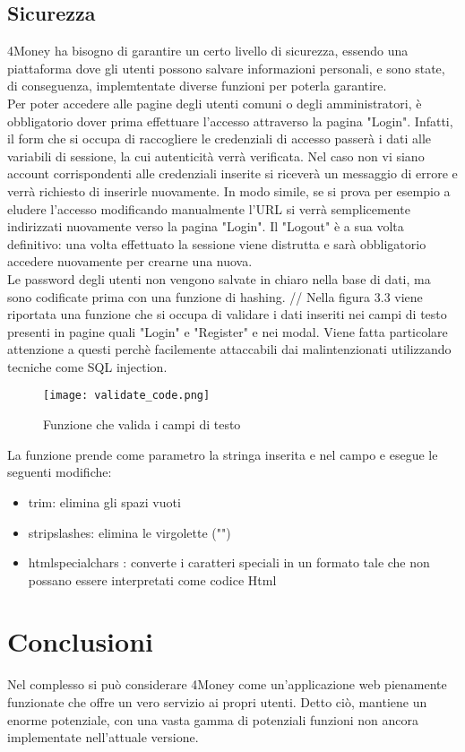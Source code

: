 \documentclass[binding=0.6cm, oneside, noexaminfo, italian]{sapthesis}
\begin{document}
\subsection{Sicurezza}
4Money ha bisogno di garantire un certo livello di sicurezza, essendo una piattaforma dove gli utenti possono salvare informazioni personali, e sono state, di conseguenza, implemtentate diverse funzioni per poterla garantire. \\
Per poter accedere alle pagine degli utenti comuni o degli amministratori, è obbligatorio dover prima effettuare l'accesso attraverso la pagina "Login". Infatti, il form che si occupa di raccogliere le credenziali di accesso passerà i dati alle variabili di sessione, la cui autenticità verrà verificata. Nel caso non vi siano account corrispondenti alle credenziali inserite si riceverà un messaggio di errore e verrà richiesto di inserirle nuovamente. In modo simile, se si prova per esempio a eludere l'accesso modificando manualmente l'URL si verrà semplicemente indirizzati nuovamente verso la pagina "Login".
Il "Logout" è a sua volta definitivo: una volta effettuato la sessione viene distrutta e sarà obbligatorio accedere nuovamente per crearne una nuova. \\
Le password degli utenti non vengono salvate in chiaro nella base di dati, ma sono codificate prima con una funzione di hashing. //
Nella figura 3.3 viene riportata una funzione che si occupa di validare i dati inseriti nei campi di testo presenti in pagine quali "Login" e "Register" e nei modal. Viene fatta particolare attenzione a questi perchè facilemente attaccabili dai malintenzionati utilizzando tecniche come SQL injection.
\newpage
\begin{figure}[h]
    \centering
    \texttt{[image: validate\_code.png]}
    \caption{Funzione che valida i campi di testo}
    \label{fig:validate_code}
\end{figure} 
La funzione prende come parametro la stringa inserita e nel campo e esegue le seguenti modifiche:
\begin{itemize}
    \item trim: elimina gli spazi vuoti
    \item stripslashes: elimina le virgolette ("")
    \item htmlspecialchars : converte i caratteri speciali in un formato tale che non possano essere interpretati come codice Html
\end{itemize}
\newpage
\section{Conclusioni}
Nel complesso si può considerare 4Money come un'applicazione web pienamente funzionate che offre un vero servizio ai propri utenti. Detto ciò, mantiene un enorme potenziale, con una vasta gamma di potenziali funzioni non ancora implementate nell'attuale versione.
\end{document}
